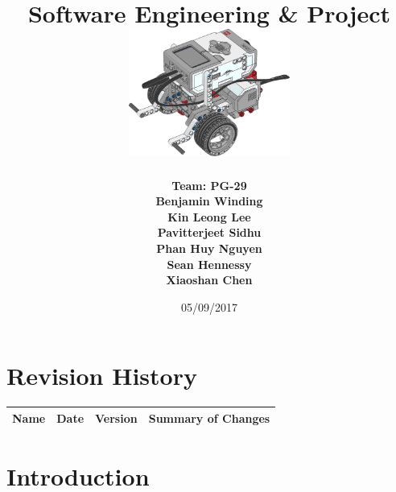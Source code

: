 \documentclass[10pt,a4paper,titlepage]{article}
\begin{document}
	
	\begin{titlepage}
		
		\title{
			\fontsize{50}{12}\\
			\vspace{20pt}
			\fontsize{20}{12}\\
			\vspace{10pt}
			\large{Software Engineering \& Project} \\
			\vspace{20pt}
			\includegraphics[width=200px]{title-page-ev3.png}					
		}
		\date{05/09/2017}
		\author{
			\bf{Team: PG-29} \\
			Benjamin Winding \\
			Kin Leong Lee \\
			Pavitterjeet Sidhu \\
			Phan Huy Nguyen \\
			Sean Hennessy \\
			Xiaoshan Chen \\
		}
		\maketitle
		
	\end{titlepage}
		 
	\tableofcontents	
	\listoffigures
	\listoftables
	
	
	\section*{Revision History}	
	\label{revtable}	
	\begin{tabular}{|p{2.1cm}|p{2.5cm}|p{2cm}|p{4.1cm}|}		
		\hline 
		\textbf {Name} & \textbf{Date} & \textbf {Version} &\textbf {Summary of Changes} \\ 
		\hline 
		\hline 		
	\end{tabular}

	\newpage
	
	\section{Introduction}
		
\end{document}
